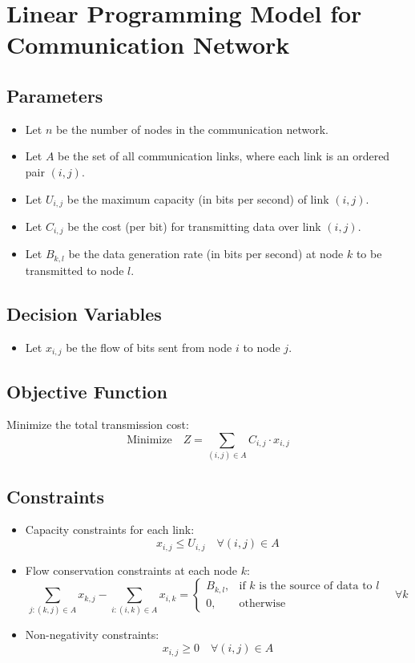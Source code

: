 \documentclass{article}
\begin{document}
\section*{Linear Programming Model for Communication Network}

\subsection*{Parameters}
\begin{itemize}
    \item Let \( n \) be the number of nodes in the communication network.
    \item Let \( A \) be the set of all communication links, where each link is an ordered pair \( (i, j) \).
    \item Let \( U_{i,j} \) be the maximum capacity (in bits per second) of link \( (i, j) \).
    \item Let \( C_{i,j} \) be the cost (per bit) for transmitting data over link \( (i, j) \).
    \item Let \( B_{k,l} \) be the data generation rate (in bits per second) at node \( k \) to be transmitted to node \( l \).
\end{itemize}

\subsection*{Decision Variables}
\begin{itemize}
    \item Let \( x_{i,j} \) be the flow of bits sent from node \( i \) to node \( j \).
\end{itemize}

\subsection*{Objective Function}
Minimize the total transmission cost:
\[
\text{Minimize} \quad Z = \sum_{(i,j) \in A} C_{i,j} \cdot x_{i,j}
\]

\subsection*{Constraints}
\begin{itemize}
    \item Capacity constraints for each link:
    \[
    x_{i,j} \leq U_{i,j} \quad \forall (i,j) \in A
    \]
    
    \item Flow conservation constraints at each node \( k \):
    \[
    \sum_{j : (k,j) \in A} x_{k,j} - \sum_{i : (i,k) \in A} x_{i,k} = 
    \begin{cases}
        B_{k,l}, & \text{if } k \text{ is the source of data to } l \\
        0, & \text{otherwise}
    \end{cases}
    \quad \forall k
    \]

    \item Non-negativity constraints:
    \[
    x_{i,j} \geq 0 \quad \forall (i,j) \in A
    \]
\end{itemize}
\end{document}
